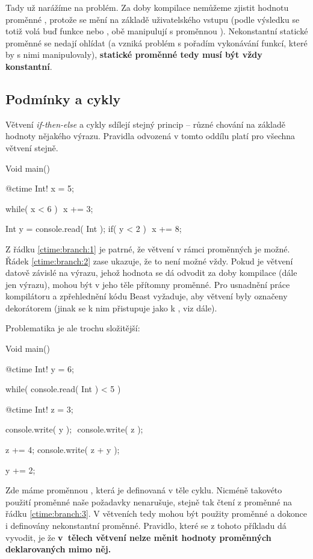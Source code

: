 Tady už narážíme na problém. Za doby kompilace nemůžeme zjistit hodnotu proměnné , protože se mění na základě uživatelského vstupu (podle výsledku  se totiž volá buď funkce  nebo , obě manipulují s proměnnou ). Nekonstantní statické proměnné se nedají ohlídat (a vzniká problém s pořadím vykonávání funkcí, které by s nimi manipulovaly), \textbf{\ctime statické proměnné tedy musí být vždy konstantní}.

\subsection{Podmínky a cykly}
Větvení \textit{if-then-else} a cykly sdílejí stejný princip -- různé chování na základě hodnoty nějakého výrazu. Pravidla odvozená v tomto oddílu platí pro všechna větvení stejně.

\begin{code}
Void main() {
	@ctime Int! x = 5;
	
	while( x < 6 ) $\label{ctime:branch:1}$
		x += 3;

	Int y = console.read( Int );
	if( y < 2 ) $\label{ctime:branch:2}$
		x += 8;
}
\end{code}

Z řádku \ref{ctime:branch:1} je patrné, že větvení v rámci \ctime proměnných je možné. Řádek \ref{ctime:branch:2} zase ukazuje, že to není možné vždy. Pokud je větvení datově závislé na výrazu, jehož hodnota se dá odvodit za doby kompilace (dále jen \ctime výrazu), mohou být v jeho těle přítomny \ctime proměnné. Pro usnadnění práce kompilátoru a zpřehlednění kódu Beast vyžaduje, aby \ctime větvení byly označeny dekorátorem (jinak se k nim přistupuje jako k \nonctime, viz dále).

Problematika je ale trochu složitější: \nopagebreak

\begin{code}
Void main() {
	@ctime Int! y = 6;

	while( console.read( Int ) < 5 ) {
		@ctime Int! z = 3;
				
		console.write( y );	$\label{ctime:branch:3}$
		console.write( z );
		
		z += 4;
		console.write( z + y );
		
		y += 2;
	}
}
\end{code}

Zde máme proměnnou , která je definovaná v těle \nonctime cyklu. Nicméně takovéto použití proměnné naše požadavky nenarušuje, stejně tak čtení z proměnné  na řádku \ref{ctime:branch:3}. V \nonctime větveních tedy mohou být použity \ctime proměnné a dokonce i definovány nekonstantní \ctime proměnné. Pravidlo, které se z tohoto příkladu dá vyvodit, je že \textbf{v~tělech \nonctime větvení nelze měnit hodnoty \ctime proměnných deklarovaných mimo něj.}

